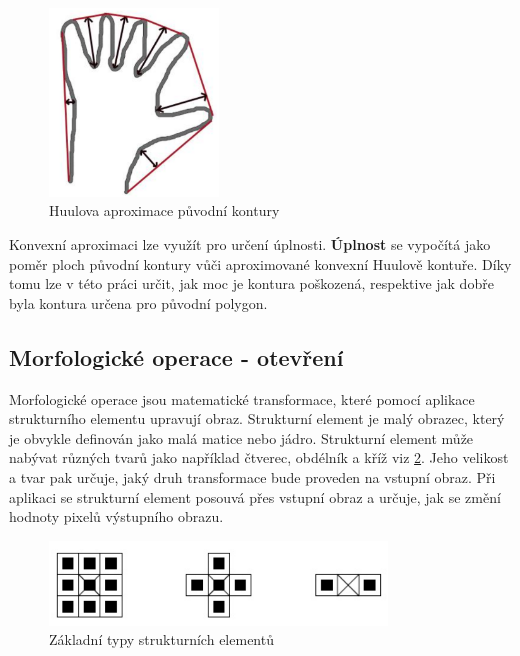 \begin{figure}[h]
	\centering
	\includegraphics[width=0.4\textwidth]{obrazky/huul.png}
	\caption{Huulova aproximace původní kontury \cite{opencv_doc}}
	\label{huul}
\end{figure}

Konvexní aproximaci lze využít pro určení úplnosti. \textbf{Úplnost} se vypočítá jako poměr ploch původní kontury vůči aproximované konvexní Huulově kontuře. Díky tomu lze v této práci určit, jak moc je kontura poškozená, respektive jak dobře byla kontura určena pro původní polygon. 



\subsection{Morfologické operace - otevření}
\label{morpho_chapter}
Morfologické operace jsou matematické transformace, které pomocí aplikace strukturního elementu upravují obraz. Strukturní element je malý obrazec, který je obvykle definován jako malá matice nebo jádro. Strukturní element může nabývat různých tvarů jako například čtverec, obdélník a kříž viz \ref{element}. Jeho velikost a tvar pak určuje, jaký druh transformace bude proveden na vstupní obraz. Při aplikaci se strukturní element posouvá přes vstupní obraz a určuje, jak se změní hodnoty pixelů výstupního obrazu.


\begin{figure}[h]
	\centering
	\includegraphics[width=0.8\textwidth]{obrazky/strukturalni_element.png}
	\caption{Základní typy strukturních elementů \cite{morfologie}}
	\label{element}
\end{figure}

